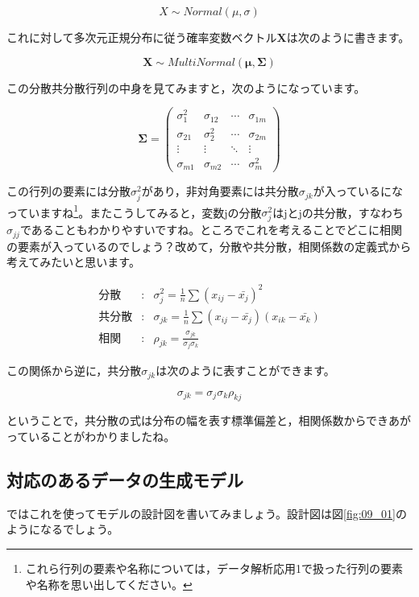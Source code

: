 \documentclass{ltjsbook}
\begin{document}
\[ X \sim Normal(\mu, \sigma) \]

これに対して多次元正規分布に従う確率変数ベクトル$\bm{X}$は次のように書きます。

\[ \bm{X} \sim MultiNormal(\bm{\mu}, \bm{\Sigma}) \]

この分散共分散行列の中身を見てみますと，次のようになっています。

\[ \bm{\Sigma} = \begin{pmatrix} \sigma_{1}^2 & \sigma_{12} & \cdots & \sigma_{1m}  \\
                \sigma_{21}  & \sigma_2^2  & \cdots & \sigma_{2m}  \\
                \vdots       & \vdots      & \ddots & \vdots       \\
                \sigma_{m1}  & \sigma_{m2} & \cdots & \sigma_{m}^2\end{pmatrix} \]

この行列の要素には分散$\sigma_j^2$があり，非対角要素には共分散$\sigma_{jk}$が入っているになっていますね\footnote{これら行列の要素や名称については，データ解析応用1で扱った行列の要素や名称を思い出してください。}。またこうしてみると，変数jの分散$\sigma_j^2$はjとjの共分散，すなわち$\sigma_{jj}$であることもわかりやすいですね。ところでこれを考えることでどこに相関の要素が入っているのでしょう？改めて，分散や共分散，相関係数の定義式から考えてみたいと思います。

\begin{eqnarray}
	\mbox{分散} &:& \sigma_{j}^2 = \frac{1}{n}\sum (x_{ij} -\bar{x_j})^2 \\
	\mbox{共分散} &:& \sigma_{jk} = \frac{1}{n}\sum (x_{ij} - \bar{x_j})(x_{ik} - \bar{x_k}) \\
	\mbox{相関} &:& \rho_{jk} = \frac{\sigma_{jk}}{\sigma_j\sigma_k}
\end{eqnarray}

この関係から逆に，共分散$\sigma_{jk}$は次のように表すことができます。

\[ \sigma_{jk} = \sigma_j \sigma_k \rho_{kj} \]

ということで，共分散の式は分布の幅を表す標準偏差と，相関係数からできあがっていることがわかりましたね。
\subsection{対応のあるデータの生成モデル}
ではこれを使ってモデルの設計図を書いてみましょう。設計図は図\ref{fig:09_01}のようになるでしょう。
\end{document}
